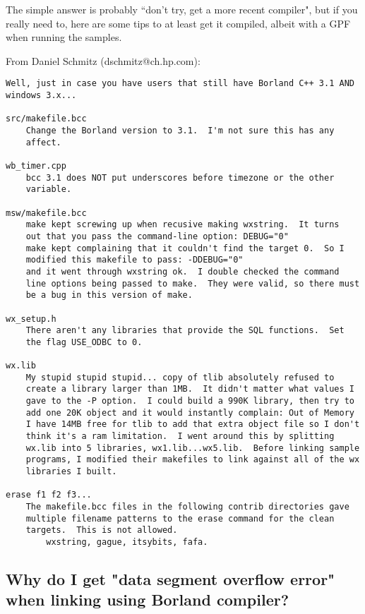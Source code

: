 The simple answer is probably ``don't try, get a more recent compiler", but if you really need
to, here are some tips to at least get it compiled, albeit with a GPF when running the samples.

From Daniel Schmitz (dschmitz@ch.hp.com):

\begin{verbatim}
Well, just in case you have users that still have Borland C++ 3.1 AND
windows 3.x...

src/makefile.bcc
    Change the Borland version to 3.1.  I'm not sure this has any
    affect.

wb_timer.cpp
    bcc 3.1 does NOT put underscores before timezone or the other
    variable.

msw/makefile.bcc
    make kept screwing up when recusive making wxstring.  It turns
    out that you pass the command-line option: DEBUG="0"
    make kept complaining that it couldn't find the target 0.  So I
    modified this makefile to pass: -DDEBUG="0"
    and it went through wxstring ok.  I double checked the command
    line options being passed to make.  They were valid, so there must
    be a bug in this version of make.

wx_setup.h
    There aren't any libraries that provide the SQL functions.  Set
    the flag USE_ODBC to 0.

wx.lib
    My stupid stupid stupid... copy of tlib absolutely refused to
    create a library larger than 1MB.  It didn't matter what values I
    gave to the -P option.  I could build a 990K library, then try to
    add one 20K object and it would instantly complain: Out of Memory
    I have 14MB free for tlib to add that extra object file so I don't
    think it's a ram limitation.  I went around this by splitting
    wx.lib into 5 libraries, wx1.lib...wx5.lib.  Before linking sample
    programs, I modified their makefiles to link against all of the wx
    libraries I built.

erase f1 f2 f3...
    The makefile.bcc files in the following contrib directories gave
    multiple filename patterns to the erase command for the clean
    targets.  This is not allowed.
        wxstring, gague, itsybits, fafa.
\end{verbatim}


\subsection{Why do I get "data segment overflow error" when linking using Borland compiler?}\label{dataseg}

